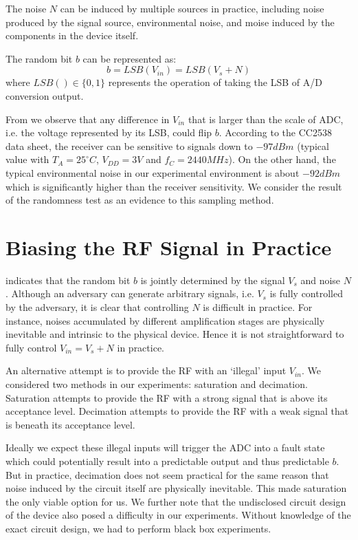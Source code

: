 The noise $N$ can be induced by multiple sources in practice, including noise produced by the signal source, environmental noise, and moise induced by the components in the device itself.


The random bit $b$ can be represented as:
\begin{equation} \label{RNDOutput}
b = LSB(V_{in}) = LSB(V_s + N)
\end{equation}
where $LSB() \in \{0,1\}$ represents the operation of taking the LSB of A/D conversion output.

From  we observe that any difference in $V_{in}$ that is larger than the scale of ADC, i.e. the voltage represented by its LSB, could flip $b$. According to the CC2538 data sheet\cite{CC2538Datasheet}, the receiver can be sensitive to signals down to $-97dBm$ (typical value with $T_A = 25^{\circ}C$, $V_{DD} = 3V$ and $f_{C} = 2440MHz$). On the other hand, the typical environmental noise in our experimental environment is about $-92dBm$ which is significantly higher than the receiver sensitivity. We consider the result of the randomness test as an evidence to this sampling method.

\section{Biasing the RF Signal in Practice}\label{Jamming}
  indicates that the random bit $b$ is jointly determined by the signal $V_s$ and noise $N$. Although an adversary can generate arbitrary signals, i.e. $V_s$ is fully  controlled by the adversary, it is clear that controlling $N$ is difficult in practice. For instance, noises accumulated by different amplification stages are physically inevitable and intrinsic to the physical device. Hence it is not straightforward to fully control $V_{in}= V_s +N$ in practice.

An alternative attempt is to provide the RF with an `illegal' input $V_{in}$. We considered two methods in our experiments: saturation and decimation. Saturation attempts to provide the RF with a strong signal that is above its acceptance level. Decimation attempts to provide the RF with a weak signal that is beneath its acceptance level.

Ideally we expect these illegal inputs will trigger the ADC into a fault state which could potentially result into a predictable output and thus predictable $b$. But in practice, decimation does not seem practical for the same reason that noise induced by the circuit itself are physically inevitable. This made saturation the only viable option for us. We further note that the undisclosed circuit design of the device also posed a difficulty in our experiments. Without knowledge of the exact circuit design, we had to perform black box experiments. 

